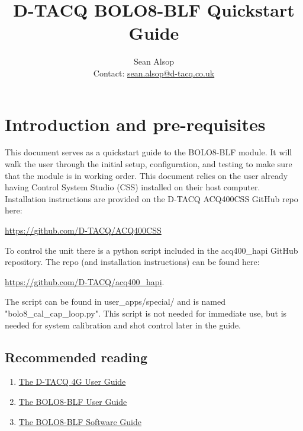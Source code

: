 \documentclass{article}
\begin{document}
\title{D-TACQ BOLO8-BLF Quickstart Guide}
\author{Sean Alsop \\ Contact: \href{mailto:sean.alsop@d-tacq.co.uk}{sean.alsop@d-tacq.co.uk} }

\maketitle


\tableofcontents

\section{Introduction and pre-requisites}
This document serves as a quickstart guide to the BOLO8-BLF module.
It will walk the user through the initial setup, configuration, and testing to make sure that the module is in working order.
This document relies on the user already having Control System Studio (CSS) installed on their host computer.
Installation instructions are provided on the D-TACQ ACQ400CSS GitHub repo here:
\newline
\centerline{ \href{https://github.com/D-TACQ/ACQ400CSS}{https://github.com/D-TACQ/ACQ400CSS} }
\newline
To control the unit there is a python script included in the acq400\_hapi GitHub repository.
The repo (and installation instructions) can be found here:
\newline
\centerline{ \href{https://github.com/D-TACQ/acq400_hapi}{https://github.com/D-TACQ/acq400\_hapi}. }
\newline
The script can be found in user\_apps/special/ and is named "bolo8\_cal\_cap\_loop.py".
This script is not needed for immediate use, but is needed for system calibration and shot control later in the guide.
\newpage
\subsection{Recommended reading}
\begin{enumerate}
	\item \href{http://www.d-tacq.com/resources/d-tacq-4G-acq4xx-UserGuide-r28.pdf}{The D-TACQ 4G User Guide}
	\item \href{http://www.d-tacq.com/resources/Bolo_calibration_report_user-guide.pdf}{The BOLO8-BLF User Guide}
	\item \href{https://github.com/seanalsop/bolodsp-doc/releases}{The BOLO8-BLF Software Guide}
\end{enumerate}
\end{document}
